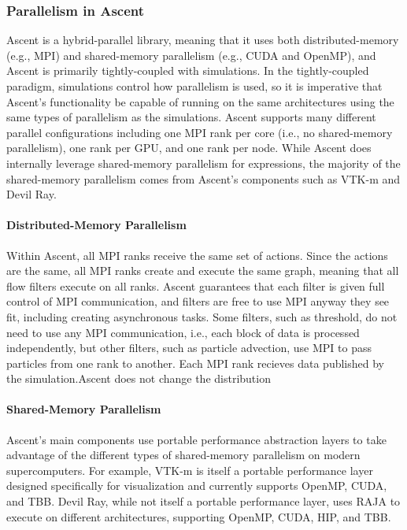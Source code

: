 \subsubsection{Parallelism in Ascent}
Ascent is a hybrid-parallel library, meaning that it uses both
distributed-memory (e.g., MPI) and shared-memory parallelism
(e.g., CUDA and OpenMP), and Ascent is primarily
tightly-coupled with simulations.
%
In the tightly-coupled paradigm, simulations control how parallelism is used, so
it is imperative that Ascent's functionality be capable of running
on the same architectures using the same types of parallelism as the
simulations.
%
Ascent supports many different parallel configurations including
one MPI rank per core (i.e., no shared-memory parallelism), one rank
per GPU, and one rank per node.
%
While Ascent does internally leverage shared-memory parallelism
for expressions, the majority of the shared-memory parallelism comes
from Ascent's components such as VTK-m and Devil Ray.

\paragraph{Distributed-Memory Parallelism}
Within Ascent, all MPI ranks receive the same set of actions.
%
Since the actions are the same, all MPI ranks create and execute the same graph,
meaning that all flow filters execute on all ranks.
%
Ascent guarantees that each filter is given full control of MPI communication,
and filters are free to use MPI anyway they see fit, including
creating asynchronous tasks.
%
Some filters, such as threshold, do not need to use any
MPI communication, i.e., each block of data is processed independently,
but other filters, such as particle advection, use MPI to pass particles
from one rank to another.
%
Each MPI rank recieves data published by the simulation.Ascent does not change the distribution

\paragraph{Shared-Memory Parallelism}
Ascent's main components use portable performance abstraction layers to
take advantage of the different types of shared-memory parallelism on
modern supercomputers.
%
For example, VTK-m is itself a portable performance layer designed specifically
for visualization and currently supports OpenMP, CUDA, and TBB.
%
Devil Ray, while not itself a portable performance layer, uses RAJA to execute
on different architectures, supporting OpenMP, CUDA, HIP, and TBB.


